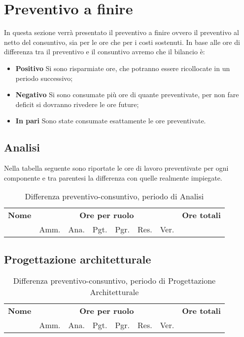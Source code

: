 \section{Preventivo a finire}
\label{consuntivo}

In questa sezione verrà presentato il preventivo a finire ovvero il preventivo al netto del consuntivo, sia per le ore che per i costi sostenuti. In base alle ore di differenza tra il preventivo e il consuntivo avremo che il bilancio è:
\begin{itemize}
\item \textbf{Positivo} Si sono risparmiate ore, che potranno essere ricollocate in un periodo successivo;
\item \textbf{Negativo} Si sono consumate più ore di quante preventivate, per non fare deficit si dovranno rivedere le ore future;
\item \textbf{In pari} Sono state consumate esattamente le ore preventivate.
\end{itemize}

\subsection{Analisi}

Nella tabella seguente sono riportate le ore di lavoro preventivate per ogni componente e tra parentesi la differenza con quelle realmente impiegate.

\begin{table}[H]
\begin{tabular}{lccccccc}
\toprule
    \textbf{Nome}  & \multicolumn{6}{c}{\textbf{Ore per ruolo}} & \textbf{Ore totali} \\
     & Amm. & Ana. & Pgt. & Pgr. & Res. & Ver. & \\
    \midrule
    
    	
    
    \bottomrule
\end{tabular}
\caption{Differenza preventivo-consuntivo, periodo di Analisi}
\end{table}

\subsection{Progettazione architetturale}

\begin{table}[H]
\begin{tabular}{lccccccc}
\toprule
    \textbf{Nome}  & \multicolumn{6}{c}{\textbf{Ore per ruolo}} & \textbf{Ore totali} \\
     & Amm. & Ana. & Pgt. & Pgr. & Res. & Ver. & \\
    \midrule
    
    	
    
    \bottomrule
\end{tabular}
\caption{Differenza preventivo-consuntivo, periodo di Progettazione Architetturale}
\end{table}

